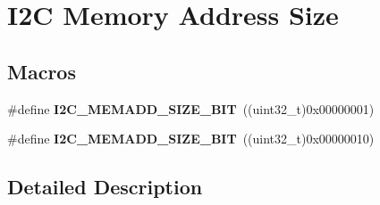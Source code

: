 \hypertarget{group___i2_c___memory___address___size}{}\section{I2C Memory Address Size}
\label{group___i2_c___memory___address___size}
\subsection*{Macros}
\begin{DoxyCompactItemize}
\item 
\#define {\bfseries I2\+C\+\_\+\+M\+E\+M\+A\+D\+D\+\_\+\+S\+I\+Z\+E\+\_\+B\+IT}~((uint32\+\_\+t)0x00000001)\hypertarget{group___i2_c___memory___address___size_ga44007b689fa80deeab22820ad0b2dc6d}{}\label{group___i2_c___memory___address___size_ga44007b689fa80deeab22820ad0b2dc6d}

\item 
\#define {\bfseries I2\+C\+\_\+\+M\+E\+M\+A\+D\+D\+\_\+\+S\+I\+Z\+E\+\_\+B\+IT}~((uint32\+\_\+t)0x00000010)\hypertarget{group___i2_c___memory___address___size_ga5b8c4b7d245fd7ab998acf2c7edd61a4}{}\label{group___i2_c___memory___address___size_ga5b8c4b7d245fd7ab998acf2c7edd61a4}

\end{DoxyCompactItemize}


\subsection{Detailed Description}
